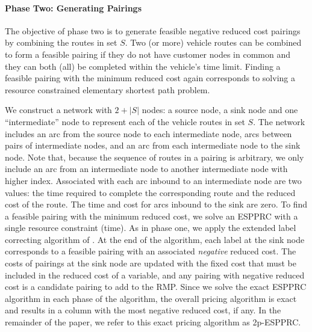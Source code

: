 \documentclass[11pt]{article}
\begin{document}

\paragraph{Phase Two: Generating Pairings}
The objective of phase two is to generate feasible negative reduced cost pairings
by combining the routes in set $S$.
Two (or more) vehicle routes can be combined to form a feasible pairing if they do not have
customer nodes in common and they can both (all) be completed within the vehicle's time limit.
Finding a feasible pairing with the minimum reduced cost again corresponds to solving a
resource constrained elementary shortest path problem.

We construct a network
with $2 + |S|$ nodes: a source node, a sink node and one ``intermediate'' node 
to represent each of the vehicle routes in set $S$.  The network includes an arc from the source node to 
each intermediate node, arcs between pairs of intermediate nodes, and an arc from each intermediate node 
to the sink node.  Note that, because the sequence of routes in a pairing
is arbitrary, we only include an arc from an intermediate node to another intermediate node with higher
index.  Associated with each arc inbound to an intermediate node are two values: the time required to
complete the corresponding route and the reduced cost of the route.  The time and cost for arcs inbound
to the sink are zero.  To find a feasible pairing with the minimum reduced cost, we solve an ESPPRC
with a single resource constraint (time).  As in phase one, we apply
the extended label correcting algorithm of \cite{Feillet}.  At the end of the algorithm, 
each label at the sink node corresponds to a feasible pairing with an associated {\em negative} 
reduced cost. The costs of pairings at the sink node are updated with the fixed cost
that must be included in the reduced cost of a variable, and any pairing with 
negative reduced cost is a candidate pairing to add to the RMP.
Since we solve the exact ESPPRC algorithm in each phase of the  algorithm, the 
overall pricing algorithm is exact and results in a column with the most negative reduced cost, if any. 
In the remainder of the paper, we refer to this exact pricing algorithm as 2p-ESPPRC.
\end{document}

